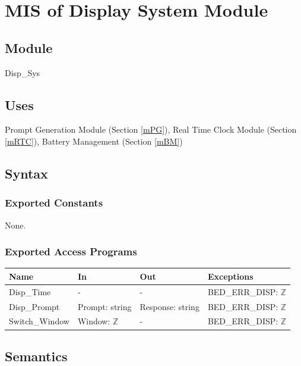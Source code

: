 \documentclass[12pt, titlepage]{article}
\begin{document}
\section{MIS of Display System Module} \label{mDS_2} 

\subsection{Module}

Disp\_Sys

\subsection{Uses}

Prompt Generation Module (Section \ref{mPG}), Real Time Clock Module (Section \ref{mRTC}), Battery Management (Section \ref{mBM})

\subsection{Syntax}

\subsubsection{Exported Constants}

None.

\subsubsection{Exported Access Programs}

\begin{center}
\begin{tabular}{p{3cm} p{3cm} p{3.5cm} p{4cm}}
\hline
\textbf{Name} & \textbf{In} & \textbf{Out} & \textbf{Exceptions} \\
\hline
Disp\_Time & - & - & BED\_ERR\_DISP: $\mathbb{Z}$ \\
Disp\_Prompt & Prompt: string & Response: string & BED\_ERR\_DISP: $\mathbb{Z}$ \\
Switch\_Window & Window:  $\mathbb{Z}$ & - &  BED\_ERR\_DISP: $\mathbb{Z}$ \\
\hline
\end{tabular}
\end{center}

\subsection{Semantics}
\end{document}
